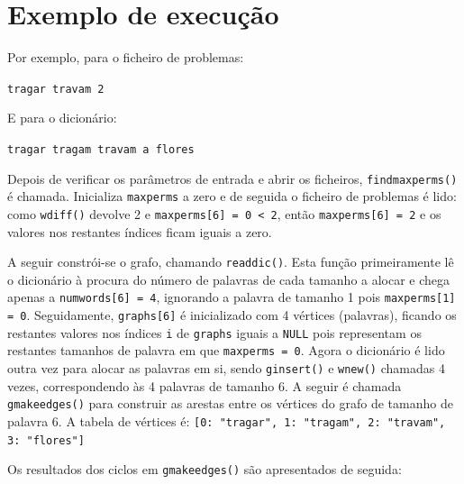 \documentclass[a4paper, 18pt]{article}
\begin{document}
\section{Exemplo de execução}
	\par
	Por exemplo, para o ficheiro de problemas:
	\begin{center}
		\texttt{tragar travam 2}
	\end{center}
	\par
	E para o dicionário:
	\begin{center}
		\texttt{tragar tragam travam a flores}
	\end{center}
	\par
	Depois de verificar os parâmetros de entrada e abrir os ficheiros, \texttt{find\textunderscore max\textunderscore perms()} é chamada.
	Inicializa \texttt{max\textunderscore perms} a zero e de seguida o ficheiro de problemas é lido: como \texttt{w\textunderscore diff()} devolve 2 e \texttt{max\textunderscore perms[6] = 0 < 2}, então \texttt{max\textunderscore perms[6] = 2} e os valores nos restantes índices ficam iguais a zero.
	\par
	A seguir constrói-se o grafo, chamando \texttt{read\textunderscore dic()}. Esta função primeiramente lê o dicionário à procura do número de palavras de cada tamanho a alocar e chega apenas a \texttt{num\textunderscore words[6] = 4}, ignorando a palavra de tamanho 1  pois \texttt{max\textunderscore perms[1] = 0}. Seguidamente, \texttt{graphs[6]} é inicializado com 4 vértices (palavras), ficando os restantes valores nos índices \texttt{i} de \texttt{graphs} iguais a \texttt{NULL} pois representam os restantes tamanhos de palavra em que \texttt{max\textunderscore perms = 0}. Agora o dicionário é lido outra vez para alocar as palavras em si, sendo \texttt{g\textunderscore insert()} e \texttt{w\textunderscore new()} chamadas 4 vezes, correspondendo às 4 palavras de tamanho 6. A seguir é chamada \texttt{g\textunderscore make\textunderscore edges()} para construir as arestas entre os vértices do grafo de tamanho de palavra 6. A tabela de vértices é:
	\texttt{[0: "tragar", 1: "tragam", 2: "travam", 3: "flores"]}
	\par
	Os resultados dos ciclos em \texttt{g\textunderscore make\textunderscore edges()} são apresentados de seguida:
\end{document}
